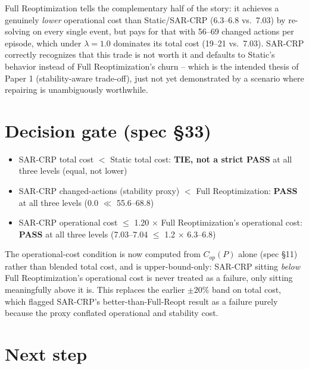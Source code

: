 \documentclass[11pt]{article}
\begin{document}
Full Reoptimization tells the complementary half of the story: it
achieves a genuinely \emph{lower} operational cost than Static/SAR-CRP
(6.3--6.8 vs.\ 7.03) by re-solving on every single event, but pays for
that with 56--69 changed actions per episode, which under $\lambda=1.0$
dominates its total cost (19--21 vs.\ 7.03). SAR-CRP correctly recognizes
that this trade is not worth it and defaults to Static's behavior instead
of Full Reoptimization's churn -- which is the intended thesis of Paper 1
(stability-aware trade-off), just not yet demonstrated by a scenario where
repairing is unambiguously worthwhile.

\section{Decision gate (spec \S33)}

\begin{itemize}
  \item SAR-CRP total cost $<$ Static total cost: \textbf{TIE, not a strict PASS} at all three levels (equal, not lower)
  \item SAR-CRP changed-actions (stability proxy) $<$ Full Reoptimization: \textbf{PASS} at all three levels (0.0 $\ll$ 55.6--68.8)
  \item SAR-CRP operational cost $\le$ 1.20 $\times$ Full Reoptimization's operational cost: \textbf{PASS} at all three levels (7.03--7.04 $\le$ 1.2 $\times$ 6.3--6.8)
\end{itemize}

The operational-cost condition is now computed from $C_{op}(P)$ alone
(spec \S11) rather than blended total cost, and is upper-bound-only:
SAR-CRP sitting \emph{below} Full Reoptimization's operational cost is
never treated as a failure, only sitting meaningfully above it is. This
replaces the earlier $\pm20\%$ band on total cost, which flagged SAR-CRP's
better-than-Full-Reopt result as a failure purely because the proxy
conflated operational and stability cost.

\section{Next step}
\end{document}
